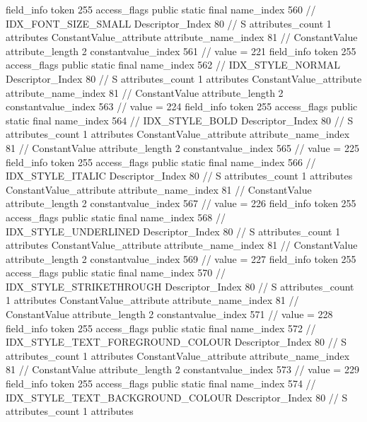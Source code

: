 {{{{{			}
			field_info {
				token	255
				access_flags	public static final
				name_index	560		// IDX_FONT_SIZE_SMALL
				Descriptor_Index	80		// S
				attributes_count	1
				attributes {
				ConstantValue_attribute {
					attribute_name_index	81		// ConstantValue
					attribute_length	2
					constantvalue_index	561		// value = 221
				}
				}
			}
			field_info {
				token	255
				access_flags	public static final
				name_index	562		// IDX_STYLE_NORMAL
				Descriptor_Index	80		// S
				attributes_count	1
				attributes {
				ConstantValue_attribute {
					attribute_name_index	81		// ConstantValue
					attribute_length	2
					constantvalue_index	563		// value = 224
				}
				}
			}
			field_info {
				token	255
				access_flags	public static final
				name_index	564		// IDX_STYLE_BOLD
				Descriptor_Index	80		// S
				attributes_count	1
				attributes {
				ConstantValue_attribute {
					attribute_name_index	81		// ConstantValue
					attribute_length	2
					constantvalue_index	565		// value = 225
				}
				}
			}
			field_info {
				token	255
				access_flags	public static final
				name_index	566		// IDX_STYLE_ITALIC
				Descriptor_Index	80		// S
				attributes_count	1
				attributes {
				ConstantValue_attribute {
					attribute_name_index	81		// ConstantValue
					attribute_length	2
					constantvalue_index	567		// value = 226
				}
				}
			}
			field_info {
				token	255
				access_flags	public static final
				name_index	568		// IDX_STYLE_UNDERLINED
				Descriptor_Index	80		// S
				attributes_count	1
				attributes {
				ConstantValue_attribute {
					attribute_name_index	81		// ConstantValue
					attribute_length	2
					constantvalue_index	569		// value = 227
				}
				}
			}
			field_info {
				token	255
				access_flags	public static final
				name_index	570		// IDX_STYLE_STRIKETHROUGH
				Descriptor_Index	80		// S
				attributes_count	1
				attributes {
				ConstantValue_attribute {
					attribute_name_index	81		// ConstantValue
					attribute_length	2
					constantvalue_index	571		// value = 228
				}
				}
			}
			field_info {
				token	255
				access_flags	public static final
				name_index	572		// IDX_STYLE_TEXT_FOREGROUND_COLOUR
				Descriptor_Index	80		// S
				attributes_count	1
				attributes {
				ConstantValue_attribute {
					attribute_name_index	81		// ConstantValue
					attribute_length	2
					constantvalue_index	573		// value = 229
				}
				}
			}
			field_info {
				token	255
				access_flags	public static final
				name_index	574		// IDX_STYLE_TEXT_BACKGROUND_COLOUR
				Descriptor_Index	80		// S
				attributes_count	1
				attributes {
}}}}}}
